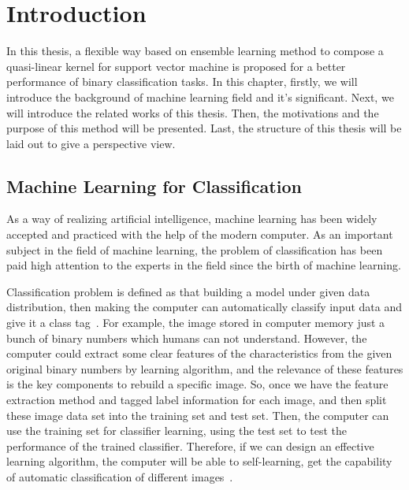 \documentclass[master]{IPSstyle}
\begin{document}
 \makepreliminarypages
 \singlespace
 \frontmatter
 \tableofcontents
 \listoffigures
 \listoftables
 \mainmatter
 \clearemptydoublepage
 \setlength{\baselineskip}{23.0pt}

\chapter{Introduction}

In this thesis, a flexible way based on ensemble learning method to compose a quasi-linear kernel for support vector machine is proposed for a better performance of binary classification tasks. In this chapter, firstly, we will introduce the background of machine learning field and it's significant. Next, we will introduce the related works of this thesis. Then, the motivations and the purpose of this method will be presented. Last, the structure of this thesis will be laid out to give a perspective view.  

\section{Machine Learning for Classification}
As a way of realizing artificial intelligence, machine learning has been widely accepted and practiced with the help of the modern computer. As an important subject in the field of machine learning, the problem of classification has been paid high attention to the experts in the field since the birth of machine learning.

Classification problem is defined as that building a model under given data distribution, then making the computer can automatically classify input data and give it a class tag~\cite{bishop2006pattern}.  For example, the image stored in computer memory just a bunch of binary numbers which humans can not understand. However, the computer could extract some clear features of the characteristics from the given original binary numbers by learning algorithm, and the relevance of these features is the key components to rebuild a specific image. So, once we have the feature extraction method and tagged label information for each image, and then split these image data set into the training set and test set. Then, the computer can use the training set for classifier learning, using the test set to test the performance of the trained classifier. Therefore, if we can design an effective learning algorithm, the computer will be able to self-learning, get the capability of automatic classification of different images~\cite{krizhevsky2012imagenet}.
\end{document}
